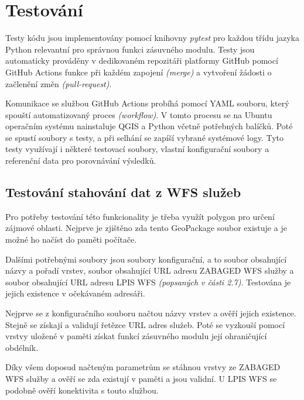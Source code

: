 \documentclass[a4paper,oneside,12pt]{book}
\begin{document}
\section{Testování} \label{testing}
\hspace{10mm} Testy kódu jsou implementovány pomocí knihovny \textit{pytest} pro každou třídu jazyka Python relevantní pro správnou funkci zásuvného modulu. Testy jsou automaticky prováděny v dedikovaném repozitáři platformy GitHub pomocí GitHub Actions funkce při každém zapojení \textit{(merge)} a vytvoření žádosti o začlenění změn  \textit{(pull-request)}.

\hspace{10mm} Komunikace se službou GitHub Actions probíhá pomocí YAML souboru, který spouští automatizovaný proces\textit{ (workflow)}. V tomto procesu se na Ubuntu operačním systému nainstaluje QGIS a Python včetně potřebných balíčků. Poté se spustí soubory s testy, a při selhání se zapíší vybrané systémové logy. Tyto testy využívají i některé testovací soubory, vlastní konfigurační soubory a referenční data pro porovnávání výsledků.

\subsection{Testování stahování dat z WFS služeb} \label{test_WFS}
\hspace{10mm} Pro potřeby testování této funkcionality je třeba využít polygon pro určení zájmové oblasti. Nejprve je zjištěno zda tento GeoPackage soubor existuje a je možné ho načíst do paměti počítače. 

\hspace{10mm} Dalšími potřebnými soubory jsou soubory konfigurační, a to soubor obsahující názvy
a pořadí vrstev, soubor obsahující URL adresu ZABAGED WFS služby  a soubor obsahující URL adresu LPIS WFS \textit{(popsaných v části 2.7)}. Testována je jejich existence v očekávaném adresáři.

\hspace{10mm} Nejprve se z konfiguračního souboru načtou názvy vrstev a ověří jejich existence.
Stejně se získají a validují řetězce URL adres služeb. Poté se vyzkouší pomocí vrstvy uložené v paměti získat funkcí zásuvného modulu její ohraničující obdélník.

\hspace{10mm} Díky všem doposud načteným parametrům se stáhnou vrstvy ze ZABAGED WFS služby a ověří se zda existují v paměti a jsou validní. U LPIS WFS se podobně ověří konektivita s touto službou.
\end{document}
